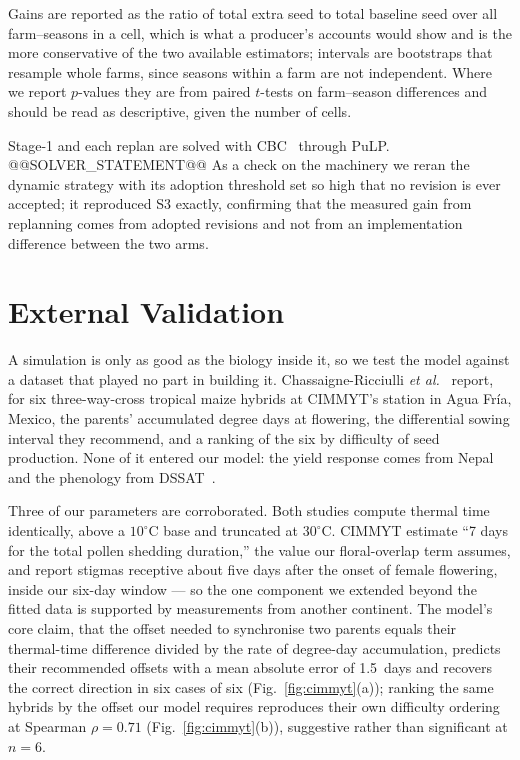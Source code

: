 \documentclass[10pt,twocolumn]{article}
\begin{document}
Gains are reported as the ratio of total extra seed to total baseline seed
over all farm--seasons in a cell, which is what a producer's accounts would
show and is the more conservative of the two available estimators;
intervals are bootstraps that resample whole farms, since seasons within a
farm are not independent. Where we report $p$-values they are from paired
$t$-tests on farm--season differences and should be read as descriptive,
given the number of cells.

Stage-1 and each replan are solved with CBC~\cite{cbc}
through PuLP. @@SOLVER_STATEMENT@@ As a check on the machinery we reran the
dynamic strategy with its adoption threshold set so high that no revision
is ever accepted; it reproduced S3 exactly, confirming that the measured
gain from replanning comes from adopted revisions and not from an
implementation difference between the two arms.

\section{External Validation}
\label{sec:validation}

A simulation is only as good as the biology inside it, so we test the model
against a dataset that played no part in building it.
Chassaigne-Ricciulli \textit{et al.}~\cite{chassaigne2021} report, for six
three-way-cross tropical maize hybrids at CIMMYT's station in Agua Fr\'ia,
Mexico, the parents' accumulated degree days at flowering, the differential
sowing interval they recommend, and a ranking of the six by difficulty of
seed production. None of it entered our model: the yield response comes from
Nepal~\cite{marahatta2025} and the phenology from DSSAT~\cite{dssat}.

Three of our parameters are corroborated. Both studies compute thermal time
identically, above a $10^\circ$C base and truncated at $30^\circ$C. CIMMYT
estimate ``7 days for the total pollen shedding duration,'' the value our
floral-overlap term assumes, and report stigmas receptive about five days
after the onset of female flowering, inside our six-day window --- so the one
component we extended beyond the fitted data is supported by measurements
from another continent. The model's core claim, that the offset needed to
synchronise two parents equals their thermal-time difference divided by the
rate of degree-day accumulation, predicts their recommended offsets with a
mean absolute error of 1.5~days and recovers the correct direction in six
cases of six (Fig.~\ref{fig:cimmyt}(a)); ranking the same hybrids by the
offset our model requires reproduces their own difficulty ordering at
Spearman $\rho = 0.71$ (Fig.~\ref{fig:cimmyt}(b)), suggestive rather than
significant at $n = 6$.
\end{document}
